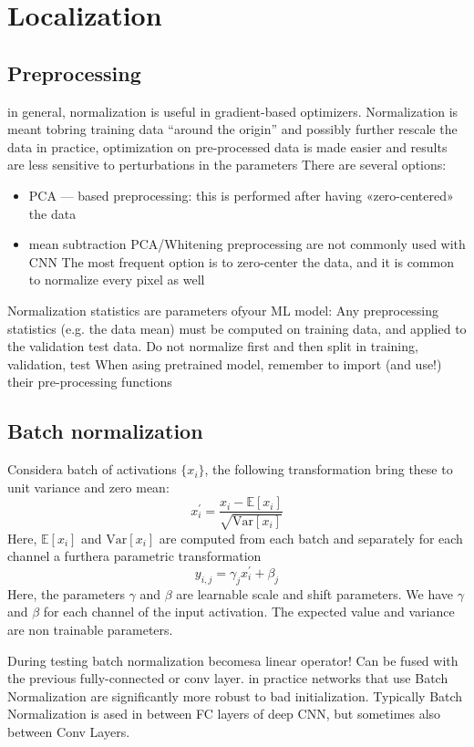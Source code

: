 \section{Localization}

\subsection{Preprocessing}
in general, normalization is useful in gradient-based optimizers.
Normalization is meant tobring training data “around the origin” and
possibly further rescale the data
in practice, optimization on pre-processed data is made easier and
results are less sensitive to perturbations in the parameters
There are several options: 
\begin{itemize}
    \item PCA — based preprocessing: this is performed after having «zero-centered» the data
    \item mean subtraction
    PCA/Whitening preprocessing are not commonly used with CNN
    The most frequent option is to zero-center the data, and it is common
    to normalize every pixel as well
\end{itemize}
Normalization statistics are parameters ofyour ML model: Any
preprocessing statistics (e.g. the data mean) must be computed on
training data, and applied to the validation test data.
Do not normalize first and then split in training, validation, test
When asing pretrained model, remember to import (and use!) their
pre-processing functions

\subsection{Batch normalization}
Considera batch of activations $\{x_i\}$, the following transformation bring these to unit variance and zero mean: 
\[x_i^\prime=\dfrac{x_i-\mathbb{E}[x_i]}{\sqrt{\text{Var}[x_i]}}\]
Here, $\mathbb{E}[x_i]$ and $\text{Var}[x_i]$ are computed from each batch and separately for each channel
a furthera parametric transformation
\[y_{i,j}=\gamma_jx_i^\prime+\beta_j\]
Here, the parameters $\gamma$ and $\beta$ are learnable scale and shift parameters. 
We have $\gamma$ and $\beta$ for each channel of the input activation. 
The expected value and variance are non trainable parameters. 

During testing batch normalization becomesa linear operator! Can be
fused with the previous fully-connected or conv layer.
in practice networks that use Batch Normalization are significantly more
robust to bad initialization.
Typically Batch Normalization is ased in between FC layers of deep CNN,
but sometimes also between Conv Layers.

